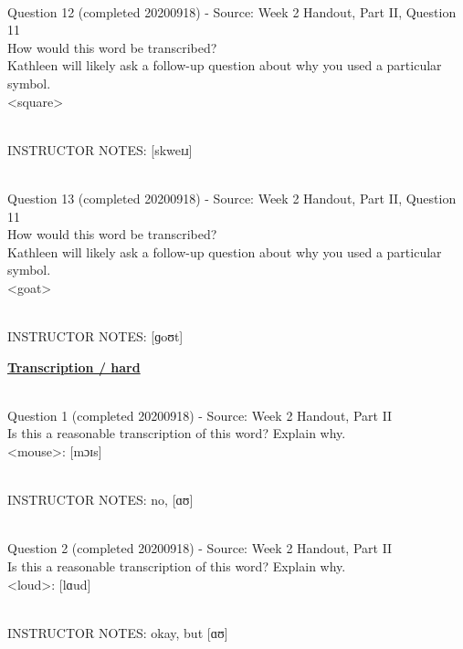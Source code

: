 \documentclass[12pt]{article}
\begin{document}
~\\

{\large Question 12} (completed 20200918) - Source: Week 2 Handout, Part II, Question 11\\

How would this word be transcribed?\\ Kathleen will likely ask a follow-up question about why you used a particular symbol.\\

<square>


~\\
INSTRUCTOR NOTES: [skweɪɹ]


~\\

{\large Question 13} (completed 20200918) - Source: Week 2 Handout, Part II, Question 11\\

How would this word be transcribed?\\ Kathleen will likely ask a follow-up question about why you used a particular symbol.\\

<goat>


~\\
INSTRUCTOR NOTES: [ɡoʊt]


\newpage\textbf{\underline{\huge Transcription / hard\\}}

~\\

{\large Question 1} (completed 20200918) - Source: Week 2 Handout, Part II\\

Is this a reasonable transcription of this word? Explain why.\\

<mouse>: {[mɔɪs]}


~\\
INSTRUCTOR NOTES: no, [ɑʊ]


~\\

{\large Question 2} (completed 20200918) - Source: Week 2 Handout, Part II\\

Is this a reasonable transcription of this word? Explain why.\\

<loud>: {[lɑud]}


~\\
INSTRUCTOR NOTES: okay, but [ɑʊ]


~\\
\end{document}
